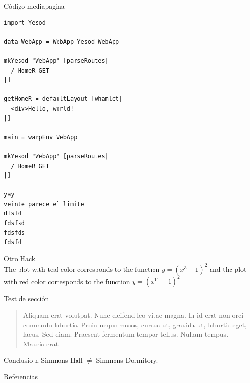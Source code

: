 \documentclass[aspectratio=169, 9pt]{beamer}
\begin{document}
\begin{frame}[label={sec:orgbe3b247},fragile]{Código mediapagina}
 \begin{threec}
\begin{verbatim}
import Yesod

data WebApp = WebApp Yesod WebApp

mkYesod "WebApp" [parseRoutes|
  / HomeR GET
|]

getHomeR = defaultLayout [whamlet|
  <div>Hello, world!
|]

main = warpEnv WebApp

mkYesod "WebApp" [parseRoutes|
  / HomeR GET
|]

yay
veinte parece el limite
dfsfd
fdsfsd
fdsfds
fdsfd
\end{verbatim}
\end{threec}
\begin{twoc}
\alert{Otro Hack} \\
The plot with teal color corresponds to the function \(y=(x^3-1)^2\) and the plot
with red color corresponds to the function \(y=(x^{11}-1)^2\)
\end{twoc}
\end{frame}

\begin{frame}[label={sec:orgc0672f0}]{Test de sección}
\begin{quote}
Aliquam erat volutpat.  Nunc eleifend leo vitae magna.  In id erat non orci
commodo lobortis.  Proin neque massa, cursus ut, gravida ut, lobortis eget, 
lacus.  Sed diam.  Praesent fermentum tempor tellus.  Nullam tempus.  Mauris 
erat.
\end{quote}

\begin{alertblock}{Conclusio    n}
Simmons Hall $\not=$ Simmons Dormitory.
\end{alertblock}
\end{frame}

\begin{frame}[label={sec:org88f2167}]{Referencias}
\printbibliography
\end{frame}
\end{document}
